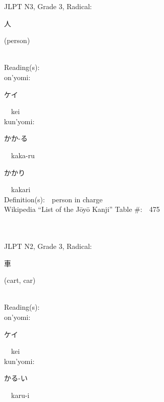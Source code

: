 \begin{multicols}{2}
{JLPT N3, Grade 3, Radical:\ \ {\begin{CJK}{UTF8}{min} 人 \end{CJK}} (person) } \\
Reading(s):\ \ \\
{\hspace*{1em}}on'yomi:\ \ \\
{\hspace*{2em}}{\begin{CJK}{UTF8}{min} ケイ \end{CJK}}\ \ kei\ \ \\
{\hspace*{1em}}kun'yomi:\ \ \\
{\hspace*{2em}}{\begin{CJK}{UTF8}{min} かか-る \end{CJK}}\ \ kaka-ru\ \ \\
{\hspace*{2em}}{\begin{CJK}{UTF8}{min} かかり \end{CJK}}\ \ kakari\ \ \\
Definition(s):\ \ person in charge \\
Wikipedia ``List of the J\=oy\=o Kanji'' Table \#:\ \ 475 \\
\ \ \\
{\fontsize{34pt}{40pt}  }\ \ \\  %
{JLPT N2, Grade 3, Radical:\ \ {\begin{CJK}{UTF8}{min} 車 \end{CJK}} (cart, car) } \\
Reading(s):\ \ \\
{\hspace*{1em}}on'yomi:\ \ \\
{\hspace*{2em}}{\begin{CJK}{UTF8}{min} ケイ \end{CJK}}\ \ kei\ \ \\
{\hspace*{1em}}kun'yomi:\ \ \\
{\hspace*{2em}}{\begin{CJK}{UTF8}{min} かる-い \end{CJK}}\ \ karu-i\ \ \\

\end{multicols}
